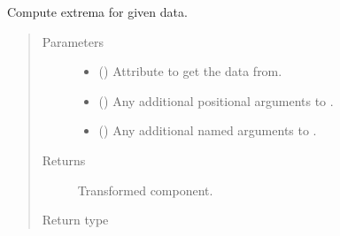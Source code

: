 \documentclass[letterpaper,10pt,english]{sphinxmanual}
\begin{document}
\begin{fulllineitems}
\begin{fulllineitems}
\label{\detokenize{api/base_classes:geology.src.base_spatial.SpatialComponent.extrema}}
Compute extrema for given data.
\begin{quote}\begin{description}
\item[{Parameters}] \leavevmode\begin{itemize}
\item {} 
 (\sphinxstyleliteralemphasis{\sphinxupquote{, }}) \textendash{} Attribute to get the data from.

\item {} 
 () \textendash{} Any additional positional arguments to .

\item {} 
 () \textendash{} Any additional named arguments to .

\end{itemize}

\item[{Returns}] \leavevmode
{} \textendash{} Transformed component.

\item[{Return type}] \leavevmode
{\hyperref[\detokenize{api/base_classes:geology.src.base_spatial.SpatialComponent}]{}}

\end{description}\end{quote}

\end{fulllineitems}



\end{fulllineitems}
\end{document}
